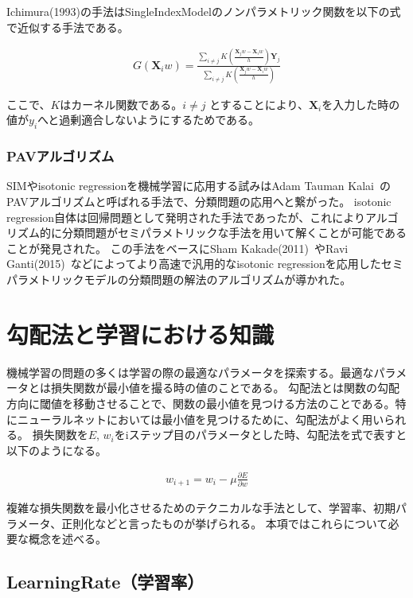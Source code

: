 Ichimura(1993)の手法はSingleIndexModelのノンパラメトリック関数を以下の式で近似する手法である。


\begin{eqnarray}
G(\mathbf{X}_iw)=\frac{\sum_{i\neq j} K\left(\frac{\mathbf{X}_j w - \mathbf{X}_i w}{h}\right)\mathbf{Y}_j}{\sum_{i\neq j} K\left(\frac{\mathbf{X}_j w - \mathbf{X}_i w}{h}\right)}
\label{eq:ichimura}
\end{eqnarray}

ここで、$ K $はカーネル関数である。$ i \neq j $ とすることにより、$ \mathbf{X}_i $を入力した時の値が$ y_i $へと過剰適合しないようにするためである。



\subsubsection{PAVアルゴリズム}

SIMやisotonic regressionを機械学習に応用する試みはAdam Tauman Kalai~\cite{isotron}のPAVアルゴリズムと呼ばれる手法で、分類問題の応用へと繋がった。
isotonic regression自体は回帰問題として発明された手法であったが、これによりアルゴリズム的に分類問題がセミパラメトリックな手法を用いて解くことが可能であることが発見された。
この手法をベースにSham Kakade(2011)~\cite{efficient_sim}やRavi Ganti(2015)~\cite{lsim}などによってより高速で汎用的なisotonic regressionを応用したセミパラメトリックモデルの分類問題の解法のアルゴリズムが導かれた。


\section{勾配法と学習における知識}
機械学習の問題の多くは学習の際の最適なパラメータを探索する。最適なパラメータとは損失関数が最小値を撮る時の値のことである。
勾配法とは関数の勾配方向に閾値を移動させることで、関数の最小値を見つける方法のことである。特にニューラルネットにおいては最小値を見つけるために、勾配法がよく用いられる。
損失関数を$ E $, $ w_i $をiステップ目のパラメータとした時、勾配法を式で表すと以下のようになる。

\begin{eqnarray}
w_{i + 1} = w_i - \mu \frac{\partial E}{\partial w}
\label{eq:learning_rate}
\end{eqnarray}

複雑な損失関数を最小化させるためのテクニカルな手法として、学習率、初期パラメータ、正則化などと言ったものが挙げられる。
本項ではこれらについて必要な概念を述べる。
\subsection{LearningRate（学習率）}

